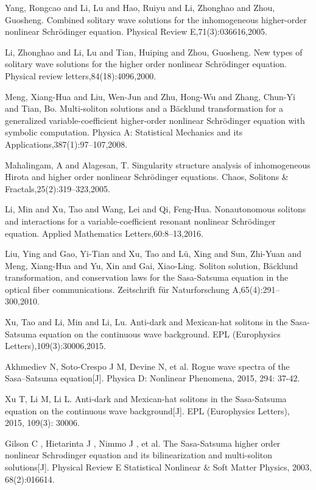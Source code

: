 \begin{thebibliography}{0}
Yang, Rongcao and Li, Lu and Hao, Ruiyu and Li, Zhonghao and Zhou, Guosheng. Combined solitary wave solutions for the inhomogeneous higher-order nonlinear Schr{\"o}dinger equation. Physical Review E,71(3):036616,2005.

Li, Zhonghao and Li, Lu and Tian, Huiping and Zhou, Guosheng. New types of solitary wave solutions for the higher order nonlinear Schr{\"o}dinger equation. Physical review letters,84(18):4096,2000.


Meng, Xiang-Hua and Liu, Wen-Jun and Zhu, Hong-Wu and Zhang, Chun-Yi and Tian, Bo. Multi-soliton solutions and a B{\"a}cklund transformation for a generalized variable-coefficient higher-order nonlinear Schr{\"o}dinger equation with symbolic computation. Physica A: Statistical Mechanics and its Applications,387(1):97--107,2008.

Mahalingam, A and Alagesan, T. Singularity structure analysis of inhomogeneous Hirota and higher order nonlinear Schr{\"o}dinger equations. Chaos, Solitons \& Fractals,25(2):319--323,2005.

Li, Min and Xu, Tao and Wang, Lei and Qi, Feng-Hua. Nonautonomous solitons and interactions for a variable-coefficient resonant nonlinear Schr{\"o}dinger equation. Applied Mathematics Letters,60:8--13,2016.

Liu, Ying and Gao, Yi-Tian and Xu, Tao and L{\"u}, Xing and Sun, Zhi-Yuan and Meng, Xiang-Hua and Yu, Xin and Gai, Xiao-Ling. Soliton solution, B{\"a}cklund transformation, and conservation laws for the Sasa-Satsuma equation in the optical fiber communications. Zeitschrift f{\"u}r Naturforschung A,65(4):291--300,2010.

Xu, Tao and Li, Min and Li, Lu. Anti-dark and Mexican-hat solitons in the Sasa-Satsuma equation on the continuous wave background. EPL (Europhysics Letters),109(3):30006,2015.




Akhmediev N, Soto-Crespo J M, Devine N, et al. Rogue wave spectra of the Sasa–Satsuma equation[J]. Physica D: Nonlinear Phenomena, 2015, 294: 37-42.

Xu T, Li M, Li L. Anti-dark and Mexican-hat solitons in the Sasa-Satsuma equation on the continuous wave background[J]. EPL (Europhysics Letters), 2015, 109(3): 30006.


Gilson C , Hietarinta J , Nimmo J , et al. The Sasa-Satsuma higher order nonlinear Schrodinger equation and its bilinearization and multi-soliton solutions[J]. Physical Review E Statistical Nonlinear \& Soft Matter Physics, 2003, 68(2):016614.


\end{thebibliography}
